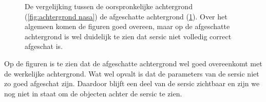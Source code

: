 \begin{figure}
\begin{minipage}{0.98\linewidth}
        \label{fig:geschatte achtergrond}
    \end{minipage}
    \caption{De vergelijking tussen de oorspronkelijke achtergrond (\cref{fig:achtergrond nasa}) de afgeschatte achtergrond (\cref{fig:geschatte achtergrond}). Over het algemeen komen de figuren goed overeen, maar op de afgeschatte achtergrond is wel duidelijk te zien dat sersic niet volledig correct afgeschat is.}
\end{figure}

Op de figuren is te zien dat de afgeschatte achtergrond wel goed overeenkomt met de werkelijke achtergrond. Wat wel opvalt is dat de parameters van de sersic niet zo goed afgeschat zijn. Daardoor blijft een deel van de sersic zichtbaar en zijn we nog niet in staat om de objecten achter de sersic te zien. 










